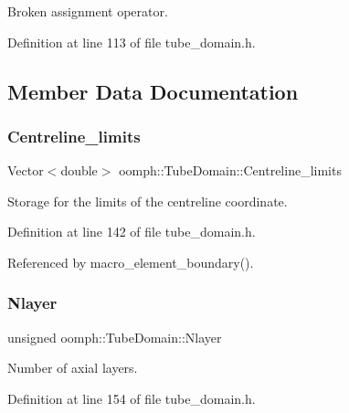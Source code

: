 Broken assignment operator. 



Definition at line 113 of file tube\+\_\+domain.\+h.



\subsection{Member Data Documentation}
\mbox{\label{classoomph_1_1TubeDomain_a472cea9a87841cc70a3b8a65e87f6aff}} 
\subsubsection{\texorpdfstring{Centreline\+\_\+limits}{Centreline\_limits}}
{\footnotesize\ttfamily Vector$<$double$>$ oomph\+::\+Tube\+Domain\+::\+Centreline\+\_\+limits\hspace{0.3cm}{\ttfamily [private]}}



Storage for the limits of the centreline coordinate. 



Definition at line 142 of file tube\+\_\+domain.\+h.



Referenced by macro\+\_\+element\+\_\+boundary().

\mbox{\label{classoomph_1_1TubeDomain_a76d77b0dde9979a92e88d3d0143bf114}} 
\subsubsection{\texorpdfstring{Nlayer}{Nlayer}}
{\footnotesize\ttfamily unsigned oomph\+::\+Tube\+Domain\+::\+Nlayer\hspace{0.3cm}{\ttfamily [private]}}



Number of axial layers. 



Definition at line 154 of file tube\+\_\+domain.\+h.



